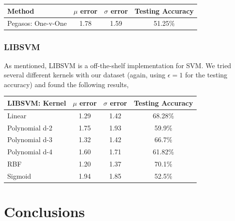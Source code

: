 \documentclass[fleqn]{article}
\begin{document}
\begin{table}[htbp]
	\centering
		\begin{tabular}{ | l | c | c | c |}
  		\hline                        
  		\textbf{Method} & \textbf{$\mu$ error} & \textbf{$\sigma$ error} & \textbf{Testing Accuracy} \\ \hline
  		Pegasos: One-v-One & 1.78 & 1.59 & 51.25\% \\ \hline
		\end{tabular}
	\label{table:AccuracyPegasos}
\end{table}

\subsubsection{LIBSVM}
\label{subsub:LIBSVM}
As mentioned, LIBSVM\cite{LIBSVM} is a off-the-shelf implementation for SVM.  We tried several different kernels with our dataset (again, using $\epsilon = 1$ for the testing accuracy) and found the following results,

\begin{table}[htbp]
	\centering
		\begin{tabular}{ | l | c | c | c |}
  		\hline                        
  		\textbf{LIBSVM: Kernel} & \textbf{$\mu$ error} & \textbf{$\sigma$ error} & \textbf{Testing Accuracy} \\ \hline
  		 Linear & 1.29 & 1.42 & 68.28\% \\ \hline
  		 Polynomial d-2 & 1.75 & 1.93 & 59.9\% \\ \hline
  		 Polynomial d-3 & 1.32 & 1.42 & 66.7\% \\ \hline
  		 Polynomial d-4 & 1.60 & 1.71 & 61.82\% \\ \hline
  		 RBF & 1.20 & 1.37 & 70.1\% \\ \hline
  		 Sigmoid & 1.94 & 1.85 & 52.5\% \\ \hline
		\end{tabular}
	\label{table:AccuracyLIBSVM}
\end{table}

\section{Conclusions}
\label{sec:Conclusions}


 
\end{document}

